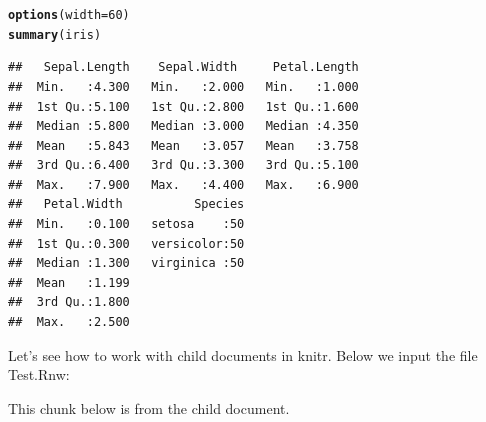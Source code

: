 \documentclass{article}\usepackage[]{graphicx}\usepackage[]{color}
\makeatletter
\newcommand{\hlnum}[1]{\textcolor[rgb]{0.686,0.059,0.569}{#1}}%
\newcommand{\hlstd}[1]{\textcolor[rgb]{0.345,0.345,0.345}{#1}}%
\newcommand{\hlkwc}[1]{\textcolor[rgb]{0.333,0.667,0.333}{#1}}%
\newcommand{\hlkwd}[1]{\textcolor[rgb]{0.737,0.353,0.396}{\textbf{#1}}}%
\newenvironment{kframe}{%
 \def\at@end@of@kframe{}%
 \ifinner\ifhmode%
  \def\at@end@of@kframe{\end{minipage}}%
  \begin{minipage}{\columnwidth}%
 \fi\fi%
 \def\FrameCommand##1{\hskip\@totalleftmargin \hskip-\fboxsep
 \colorbox{shadecolor}{##1}\hskip-\fboxsep
     \hskip-\linewidth \hskip-\@totalleftmargin \hskip\columnwidth}%
 \MakeFramed {\advance\hsize-\width
   \@totalleftmargin\z@ \linewidth\hsize
   \@setminipage}}%
 {\par\unskip\endMakeFramed%
 \at@end@of@kframe}
\newenvironment{knitrout}{}{} %
\makeatother
\begin{document}
\begin{knitrout}
\color{fgcolor}\begin{kframe}
\begin{alltt}
\hlkwd{options}\hlstd{(}\hlkwc{width} \hlstd{=} \hlnum{60}\hlstd{)}
\hlkwd{summary}\hlstd{(iris)}
\end{alltt}
\begin{verbatim}
##   Sepal.Length    Sepal.Width     Petal.Length  
##  Min.   :4.300   Min.   :2.000   Min.   :1.000  
##  1st Qu.:5.100   1st Qu.:2.800   1st Qu.:1.600  
##  Median :5.800   Median :3.000   Median :4.350  
##  Mean   :5.843   Mean   :3.057   Mean   :3.758  
##  3rd Qu.:6.400   3rd Qu.:3.300   3rd Qu.:5.100  
##  Max.   :7.900   Max.   :4.400   Max.   :6.900  
##   Petal.Width          Species  
##  Min.   :0.100   setosa    :50  
##  1st Qu.:0.300   versicolor:50  
##  Median :1.300   virginica :50  
##  Mean   :1.199                  
##  3rd Qu.:1.800                  
##  Max.   :2.500
\end{verbatim}
\end{kframe}
\end{knitrout}

Let's see how to work with child documents in knitr. Below we input
the file \textsf{Test.Rnw}:


This chunk below is from the child document.
\end{document}
